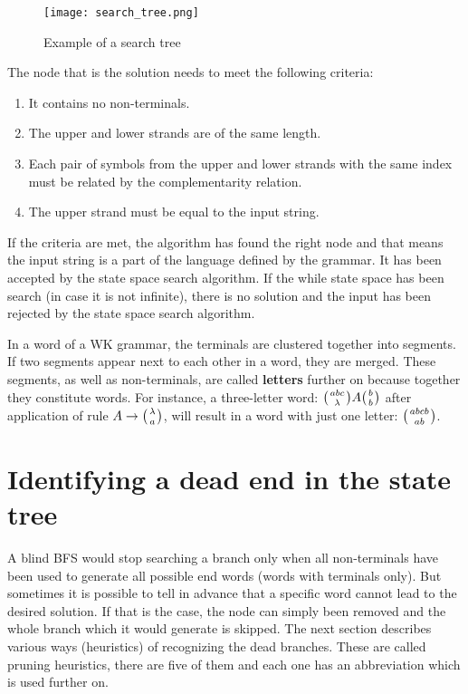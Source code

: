 \begin{figure}[h]
  \centering
  \texttt{[image: search\_tree.png]}
  \caption{Example of a search tree}
  \label{fig:search_tree}
\end{figure}

The node that is the solution needs to meet the following criteria:
\begin{enumerate}
  \item{It contains no non-terminals.}
  \item{The upper and lower strands are of the same length.}
  \item{Each pair of symbols from the upper and lower strands with the same index must be related by the complementarity relation.}
  \item{The upper strand must be equal to the input string.}
\end{enumerate}
If the criteria are met, the algorithm has found the right node and that means the input string is a part of the language defined by the grammar. It has been accepted by the state space search algorithm. If the while state space has been search (in case it is not infinite), there is no solution and the input has been rejected by the state space search algorithm.

In a word of a WK grammar, the terminals are clustered together into segments. If two segments appear next to each other in a word, they are merged. These segments, as well as non-terminals, are called \textbf{letters} further on because together they constitute words. For instance, a three-letter word: $\wkpair{abc}{\lambda} A \wkpair{b}{b}$ after application of rule $A \rightarrow \wkpair{\lambda}{a}$, will result in a word with just one letter: $\wkpair{abcb}{ab}$.

\section{Identifying a dead end in the state tree}
A blind BFS would stop searching a branch only when all non-terminals have been used to generate all possible end words (words with terminals only). But sometimes it is possible to tell in advance that a specific word cannot lead to the desired solution. If that is the case, the node can simply been removed and the whole branch which it would generate is skipped. The next section describes various ways (heuristics) of recognizing the dead branches. These are called pruning heuristics, there are five of them and each one has an abbreviation which is used further on.

